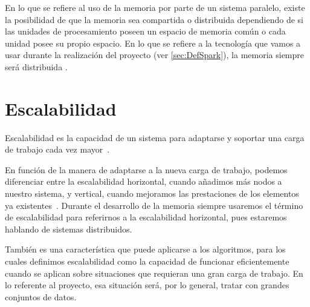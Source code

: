 En lo que se refiere al uso de la memoria por parte de un sistema paralelo, existe la posibilidad de que la memoria sea compartida o distribuida dependiendo de si las unidades de procesamiento poseen un espacio de memoria común o cada unidad posee su propio espacio. En lo que se refiere a la tecnología que vamos a usar durante la realización del proyecto (ver \ref{sec:DefSpark}), la memoria siempre será distribuida \cite{SparkPaper}.

\section{Escalabilidad}\label{sec:DefEscalabilidad}

Escalabilidad es la capacidad de un sistema para adaptarse y soportar una carga de trabajo cada vez mayor~\cite{Bondi:2000}.

En función de la manera de adaptarse a la nueva carga de trabajo, podemos diferenciar entre la escalabilidad horizontal, cuando añadimos más nodos a nuestro sistema, y vertical, cuando mejoramos las prestaciones de los elementos ya existentes~\cite{EscalabilidadWiki}. Durante el desarrollo de la memoria siempre usaremos el término de escalabilidad para referirnos a la escalabilidad horizontal, pues estaremos hablando de sistemas distribuidos.

También es una característica que puede aplicarse a los algoritmos, para los cuales definimos escalabilidad como la capacidad de funcionar eficientemente cuando se aplican sobre situaciones que requieran una gran carga de trabajo. En lo referente al proyecto, esa situación será, por lo general, tratar con grandes conjuntos de datos.




